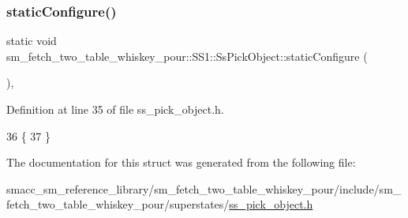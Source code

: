 \subsubsection{\texorpdfstring{static\+Configure()}{staticConfigure()}}
{\footnotesize\ttfamily static void sm\+\_\+fetch\+\_\+two\+\_\+table\+\_\+whiskey\+\_\+pour\+::\+S\+S1\+::\+Ss\+Pick\+Object\+::static\+Configure (\begin{DoxyParamCaption}{ }\end{DoxyParamCaption})\hspace{0.3cm}{\ttfamily [inline]}, {\ttfamily [static]}}



Definition at line 35 of file ss\+\_\+pick\+\_\+object.\+h.


\begin{DoxyCode}
36             \{
37             \}
\end{DoxyCode}


The documentation for this struct was generated from the following file\+:\begin{DoxyCompactItemize}
\item 
smacc\+\_\+sm\+\_\+reference\+\_\+library/sm\+\_\+fetch\+\_\+two\+\_\+table\+\_\+whiskey\+\_\+pour/include/sm\+\_\+fetch\+\_\+two\+\_\+table\+\_\+whiskey\+\_\+pour/superstates/\hyperlink{sm__fetch__two__table__whiskey__pour_2include_2sm__fetch__two__table__whiskey__pour_2superstates_2ss__pick__object_8h}{ss\+\_\+pick\+\_\+object.\+h}\end{DoxyCompactItemize}
